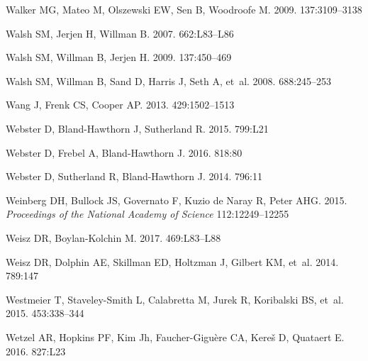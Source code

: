 \documentclass[a4paper]{ar-1col}
\begin{document}
\begin{thebibliography}{}
{Walker} MG, {Mateo} M, {Olszewski} EW, {Sen} B, {Woodroofe} M.
  2009{}.
\textit{\aj} 137:3109--3138

{Walsh} SM, {Jerjen} H, {Willman} B. 2007.
\textit{\apjl} 662:L83--L86

{Walsh} SM, {Willman} B, {Jerjen} H. 2009.
\textit{\aj} 137:450--469

{Walsh} SM, {Willman} B, {Sand} D, {Harris} J, {Seth} A, et~al. 2008.
\textit{\apj} 688:245--253

{Wang} J, {Frenk} CS, {Cooper} AP. 2013.
\textit{\mnras} 429:1502--1513

{Webster} D, {Bland-Hawthorn} J, {Sutherland} R. 2015.
\textit{\apjl} 799:L21

{Webster} D, {Frebel} A, {Bland-Hawthorn} J. 2016.
\textit{\apj} 818:80

{Webster} D, {Sutherland} R, {Bland-Hawthorn} J. 2014.
\textit{\apj} 796:11

{Weinberg} DH, {Bullock} JS, {Governato} F, {Kuzio de Naray} R, {Peter} AHG.
  2015.
\textit{Proceedings of the National Academy of Science} 112:12249--12255

{Weisz} DR, {Boylan-Kolchin} M. 2017.
\textit{\mnras} 469:L83--L88

{Weisz} DR, {Dolphin} AE, {Skillman} ED, {Holtzman} J, {Gilbert} KM, et~al.
  2014.
\textit{\apj} 789:147

{Westmeier} T, {Staveley-Smith} L, {Calabretta} M, {Jurek} R, {Koribalski} BS,
  et~al. 2015.
\textit{\mnras} 453:338--344

{Wetzel} AR, {Hopkins} PF, {Kim} Jh, {Faucher-Gigu{\`e}re} CA, {Kere{\v s}} D,
  {Quataert} E. 2016.
\textit{\apjl} 827:L23


\end{thebibliography}
\end{document}
